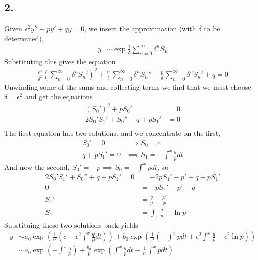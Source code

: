 \documentclass[12pt]{article}
\newcommand{\eq}[1]{\begin{align*}#1\end{align*}}
\begin{document}
\subsection*{2.} Given $\epsilon^2y'' + py' + qy = 0$, we insert the approximation (with $\delta$ to be determined),
\eq{
	y &\sim \exp{\frac{1}{\delta}\sum_{n=0}^\infty \delta^n S_n}
}
Substituting this gives the equation
\eq{
	\frac{\epsilon^2}{\delta^2}(\sum_{n=0}^\infty \delta^n S_n')^2 + \frac{\epsilon^2}{\delta}\sum_{n=0}^\infty\delta^n S_n'' + \frac{p}{\delta}\sum_{n=0}^\infty\delta^n S_n' + q = 0
}
Unwinding some of the sums and collecting terms we find that we must choose $\delta = \epsilon^2$ and get the equations
\eq{
	(S_0')^2 + pS_0' &= 0\\
	2S_0'S_1' + S_0'' + q + pS_1' &= 0\\
}
The first equation has two solutions, and we concentrate on the first,
\eq{
	S_0' = 0 &\implies S_0 = c\\
	q + pS_1' = 0 &\implies S_1 = -\int^x \frac{q}{p} dt
}
And now the second, $S_0' = -p \implies S_0 = -\int^x p dt$, so
\eq{
	2S_0'S_1' + S_0'' + q + pS_1' = 0 &= -2pS_1' - p' + q + pS_1'\\
	0 &= -pS_1' - p' + q\\
	S_1' &= \frac{q}{p} - \frac{p'}{p}\\
	S_1 &= \int_x \frac{q}{p} - \ln p
}
Substituing these two solutions back yields
\eq{
	y &\sim a_0\exp\left({\frac{1}{\epsilon^2}\left(c - \epsilon^2 \int^x \frac{q}{p} dt\right)}\right) + b_0\exp\left({\frac{1}{\epsilon^2}\left(-\int^x p dt + \epsilon^2 \int^x \frac{q}{p} - \epsilon^2 \ln p\right)}\right)\\
	&\sim a_0\exp\left({-\int^x \frac{q}{p}}\right) + \frac{b_0}{p}\exp\left({\int^x\frac{q}{p} dt - \frac{1}{\epsilon^2}\int^x p dt}\right)
}
\end{document}
